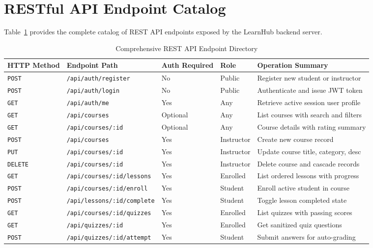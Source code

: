 \documentclass[12pt,a4paper]{report}
\begin{document}
\section{RESTful API Endpoint Catalog}
Table~\ref{tab:api} provides the complete catalog of REST API endpoints exposed by the LearnHub backend server.

\begin{table}[H]
\centering
\caption{Comprehensive REST API Endpoint Directory}
\label{tab:api}
\begin{tabularx}{\textwidth}{@{}llllX@{}}
\toprule
\textbf{HTTP Method} & \textbf{Endpoint Path} & \textbf{Auth Required} & \textbf{Role} & \textbf{Operation Summary} \\ \midrule
\texttt{POST} & \texttt{/api/auth/register} & No & Public & Register new student or instructor \\
\texttt{POST} & \texttt{/api/auth/login} & No & Public & Authenticate and issue JWT token \\
\texttt{GET} & \texttt{/api/auth/me} & Yes & Any & Retrieve active session user profile \\
\texttt{GET} & \texttt{/api/courses} & Optional & Any & List courses with search and filters \\
\texttt{GET} & \texttt{/api/courses/:id} & Optional & Any & Course details with rating summary \\
\texttt{POST} & \texttt{/api/courses} & Yes & Instructor & Create new course record \\
\texttt{PUT} & \texttt{/api/courses/:id} & Yes & Instructor & Update course title, category, desc \\
\texttt{DELETE} & \texttt{/api/courses/:id} & Yes & Instructor & Delete course and cascade records \\
\texttt{GET} & \texttt{/api/courses/:id/lessons} & Yes & Enrolled & List ordered lessons with progress \\
\texttt{POST} & \texttt{/api/courses/:id/enroll} & Yes & Student & Enroll active student in course \\
\texttt{POST} & \texttt{/api/lessons/:id/complete} & Yes & Student & Toggle lesson completed state \\
\texttt{GET} & \texttt{/api/courses/:id/quizzes} & Yes & Enrolled & List quizzes with passing scores \\
\texttt{GET} & \texttt{/api/quizzes/:id} & Yes & Enrolled & Get sanitized quiz questions \\
\texttt{POST} & \texttt{/api/quizzes/:id/attempt} & Yes & Student & Submit answers for auto-grading \\

\end{tabularx}
\end{table}
\end{document}

